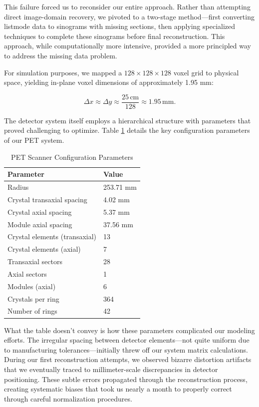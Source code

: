 \documentclass[
reprint,
superscriptaddress,
nofootinbib,
amsmath,amssymb,
aps,
prd,
]{revtex4-2}
\begin{document}
This failure forced us to reconsider our entire approach. Rather than attempting direct image-domain recovery, we pivoted to a two-stage method—first converting listmode data to sinograms with missing sections, then applying specialized techniques to complete these sinograms before final reconstruction. This approach, while computationally more intensive, provided a more principled way to address the missing data problem.

For simulation purposes, we mapped a $128\times128\times128$ voxel grid to physical space, yielding in-plane voxel dimensions of approximately 1.95 mm:

\begin{equation}
\Delta x \approx \Delta y \approx \frac{25\,\text{cm}}{128} \approx 1.95\,\text{mm}.
\end{equation}

The detector system itself employs a hierarchical structure with parameters that proved challenging to optimize. Table \ref{tab:detector_params} details the key configuration parameters of our PET system.

\begin{table}[htbp]
    \centering
    \caption{PET Scanner Configuration Parameters}
    \label{tab:detector_params}
    \begin{tabular}{l l}
    \toprule
    \textbf{Parameter} & \textbf{Value} \\
    \midrule
    Radius & 253.71 mm \\
    Crystal transaxial spacing & 4.02 mm \\
    Crystal axial spacing & 5.37 mm \\
    Module axial spacing & 37.56 mm \\
    Crystal elements (transaxial) & 13 \\
    Crystal elements (axial) & 7 \\
    Transaxial sectors & 28 \\
    Axial sectors & 1 \\
    Modules (axial) & 6 \\
    Crystals per ring & 364 \\
    Number of rings & 42 \\
    \bottomrule
    \end{tabular}
\end{table}

What the table doesn't convey is how these parameters complicated our modeling efforts. The irregular spacing between detector elements—not quite uniform due to manufacturing tolerances—initially threw off our system matrix calculations. During our first reconstruction attempts, we observed bizarre distortion artifacts that we eventually traced to millimeter-scale discrepancies in detector positioning. These subtle errors propagated through the reconstruction process, creating systematic biases that took us nearly a month to properly correct through careful normalization procedures.
\end{document}
